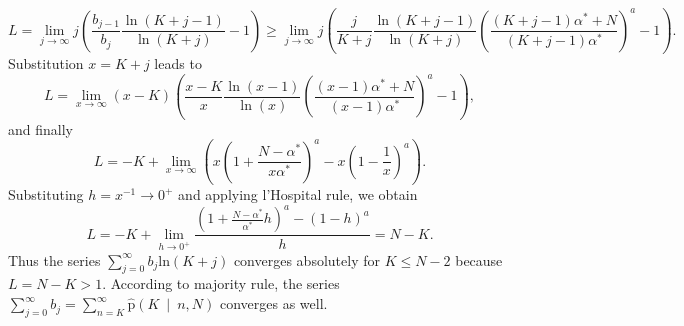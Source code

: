 \begin{equation}
L = \lim_{j \to \infty} j \left( \frac{b_{j-1}}{b_{j}} \frac{\ln(K+j-1)}{\ln(K+j)}   - 1   \right) \geq \lim_{j \to \infty} j \left( \frac{j}{K+j} \frac{\ln(K+j-1)}{\ln(K+j)} {\left( \frac{(K+j-1)\alpha^* + N}{(K+j-1)\alpha^* } \right)}^{a} - 1   \right).
\end{equation}
Substitution $x=K+j$ leads to
\begin{equation}
L = \lim_{x \to \infty} (x-K)  \left( \frac{x-K}{x} \frac{\ln(x-1)}{\ln(x)} {\left( \frac{(x-1)\alpha^* + N}{(x-1)\alpha^*} \right)}^{a} - 1   \right),
\end{equation}
and finally
\begin{equation}
L = -K + \lim_{x \to \infty} \left( x{\left( 1 + \frac{N-\alpha^{*}}{x\alpha^{*}} \right)}^{a} -x{\left( 1 - \frac{1}{x} \right)}^{a} \right).
\end{equation}
Substituting $h = x^{-1} \to 0^{+}$ and applying l'Hospital rule, we obtain
\begin{equation}
L = -K + \lim_{h \to 0^{+}} \frac{ \left( 1+\frac{N-\alpha^{*}}{\alpha^{*}}h \right)^{a} - {(1-h)}^{a}}{h}  = N-K.
\end{equation}
Thus the series $\sum_{j=0}^{\infty}{b_j \mathrm{ln}(K+j)} $ converges absolutely for  $K \leq N-2$ because $L = N-K > 1$.
According to majority rule, the series $\sum_{j=0}^{\infty}{b_j} = \sum_{n=K}^{\infty}{\mathrm{\hat{p}}\left(K \: \middle| \: n,N\right)}$ converges as well.